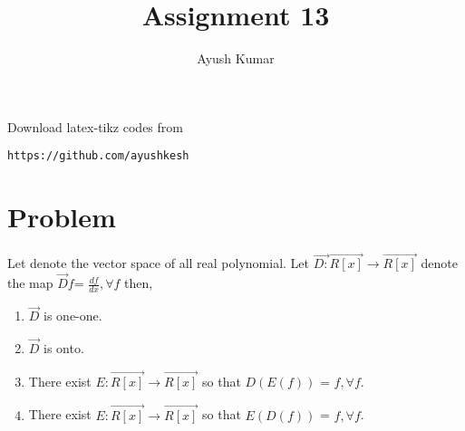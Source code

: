 \documentclass[journal,12pt]{IEEEtran}
\begin{document}
     \def\rightbox#1{\makebox[0in][r]{#1}}
     \def\centbox#1{\makebox[0in]{#1}}
     \def\topbox#1{\raisebox{-\baselineskip}[0in][0in]{#1}}
     \def\midbox#1{\raisebox{-0.5\baselineskip}[0in][0in]{#1}}
\vspace{3cm}
\title{Assignment 13}
\author{Ayush Kumar}
\maketitle
\bigskip
\renewcommand{\thefigure}{\theenumi}
\renewcommand{\thetable}{\theenumi}
Download latex-tikz codes from 
%
\begin{lstlisting}
https://github.com/ayushkesh
\end{lstlisting}
%
\section{\textbf{Problem}}
Let  denote the vector space of all real polynomial. Let $\vec{D:}\vec{R[x]}\rightarrow \vec{R[x]}$ denote the map $\vec{D}f$= $\frac{df}{dx}, \forall f $ then,\\ 
\begin{enumerate}
\item $\vec{D}$ is one-one.
\item $\vec{D}$ is onto. 
\item There exist $E: \vec{R[x]} \rightarrow \vec{R[x]}$ so that $D(E(f))$ = $f, \forall f$.
\item There exist $E:\vec{R[x]} \rightarrow \vec{R[x]}$ so that $E(D(f))$ = $f, \forall f$.
\end{enumerate}
%
\end{document}
